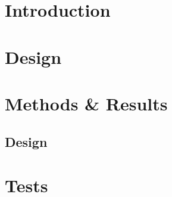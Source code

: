 %
\tableofcontents%
%
\mainmatter%
%
\chapter{Introduction}
\linenumbers







\chapter{Design}
\label{sec:design}







\chapter{Methods \& Results}
\label{sec:structure}



\section{Design}



% 
% 














 


\chapter{Tests}
\label{sec:tests}





